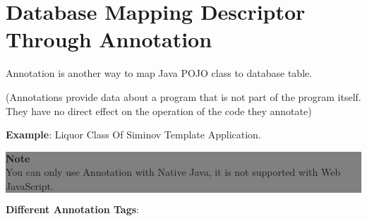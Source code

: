 \newpage
\section{Database Mapping Descriptor Through Annotation}
Annotation is another way to map Java POJO class to database table.

\par
(Annotations provide data about a program that is not part of the program itself. They have no direct effect on the operation of the code they annotate)



\textbf{Example}: Liquor Class Of Siminov Template Application.


\begin{center}
		\colorbox{grey}{
			\parbox[t]{.8\linewidth}{
				\fontsize{11pt}{11pt}\selectfont %
				\vspace*{0.1cm} %
		
				\hfill \textbf{Note} \\

				\hfill 
					You can only use Annotation with Native Java, it is not supported with Web JavaScript.
	
				\vspace*{0.0cm} %
			}
		}

\end{center}


\textbf{Different Annotation Tags}:

